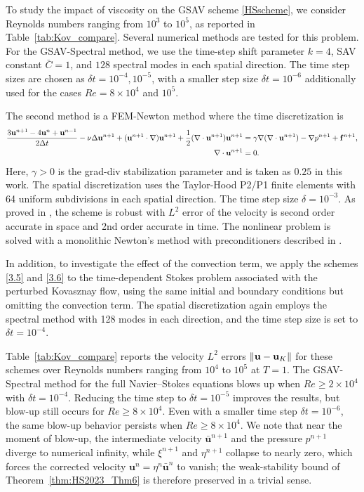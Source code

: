 \documentclass{article}
\theoremstyle{definition}                   %
\begin{document}
To study the impact of viscosity on the GSAV scheme \eqref{HSscheme}, we consider Reynolds numbers ranging from $10^3$ to $10^5$, as reported in Table~\ref{tab:Kov_compare}. Several numerical methods are tested for this problem.
For the GSAV-Spectral method, we use the time-step shift parameter $k=4$, SAV constant $\bar C=1$, and $128$ spectral modes in each spatial direction. The time step sizes are chosen as $\delta t=10^{-4},10^{-5}$, with a smaller step size $\delta t=10^{-6}$ additionally used for the cases $Re=8\times 10^4$ and $10^5$.

The second method is a FEM-Newton method where the time discretization is 
\begin{align}
\frac{3{\bf u}^{n+1}-4{\bf u}^n+{\bf u}^{n-1}}{2\Delta t}
-\nu \Delta {\bf u}^{n+1}
+({\bf u}^{n+1}\cdot \nabla){\bf u}^{n+1}
+\frac12 (\nabla\cdot {\bf u}^{n+1}){\bf u}^{n+1}
&=
\gamma \nabla(\nabla \cdot {\bf u}^{n+1})
-\nabla p^{n+1}
+ {\bf f}^{n+1},
\label{eq:BDF2-NSE}
\\
\nabla \cdot {\bf u}^{n+1}&=0.
\label{eq:BDF2-div}
\end{align}
Here, $\gamma>0$ is the grad-div stabilization parameter and is taken as $0.25$ in this work. The spatial discretization uses the Taylor-Hood P2/P1 finite elements with 64 uniform subdivisions in each spatial direction. The time step size $\delta=10^{-3}$. As proved in \cite[Theorem~3]{GarciaArchillaJohnNovo2025}, the scheme is robust with $L^2$ error of the velocity is second order accurate in space and 2nd order accurate in time. 
The nonlinear problem is solved with a monolithic Newton's method with preconditioners described in \cite{CharnyiHeisterOlshanskiiRebholz2017}.

In addition, to investigate the effect of the convection term, we apply the schemes \eqref{3.5} and \eqref{3.6} to the time-dependent Stokes problem associated with the perturbed Kovasznay flow, using the same initial and boundary conditions but omitting the convection term. The spatial discretization again employs the spectral method with 128 modes in each direction, and the time step size is set to $\delta t=10^{-4}$.

Table~\ref{tab:Kov_compare} reports the velocity $L^{2}$ errors $\|{\bf u} - {\bf u}_K\|$ for these schemes over Reynolds numbers ranging from $10^4$ to $10^5$ at $T=1$. The GSAV-Spectral method for the full Navier--Stokes equations blows up when $Re\ge 2\times 10^4$ with $\delta t=10^{-4}$. Reducing the time step to $\delta t=10^{-5}$ improves the results, but blow-up still occurs for $Re\ge 8\times 10^4$. Even with a smaller time step $\delta t=10^{-6}$, the same blow-up behavior persists when $Re\ge 8\times 10^4$. 
We note that near the moment of blow-up, the  intermediate velocity $\bar{\mathbf u}^{n+1}$ and the pressure $p^{n+1}$ diverge to numerical infinity, while $\xi^{n+1}$ and $\eta^{n+1}$ collapse to nearly zero, which forces the corrected velocity $\mathbf u^{n}=\eta^{n}\bar{\mathbf u}^{n}$ to vanish; the weak-stability bound of Theorem~\ref{thm:HS2023_Thm6} is therefore preserved in a trivial sense.
\end{document}

